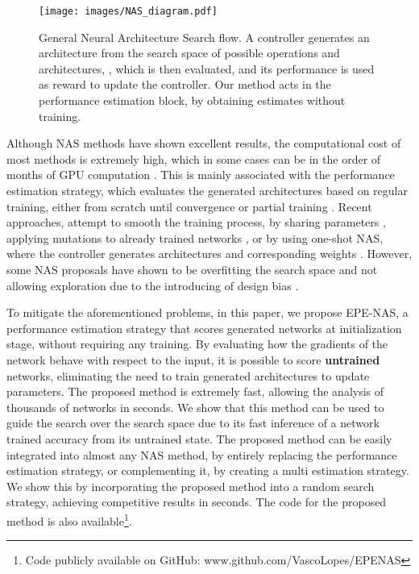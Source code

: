 \documentclass[10pt, conference]{IEEEtran}
\begin{document}
\begin{figure}[!t]
    \centering
    \texttt{[image: images/NAS\_diagram.pdf]}
    \caption{General Neural Architecture Search flow. A controller generates an architecture  from the search space of possible operations and architectures, , which is then evaluated, and its performance is used as reward to update the controller. Our method acts in the performance estimation block, by obtaining estimates without training. \label{fig:nasdiagram}}
\end{figure}

Although NAS methods have shown excellent results, the computational cost of most methods is extremely high, which in some cases can be in the order of months of GPU computation \cite{DBLP:conf/iclr/ZophL17, liu2018progressive, Zoph_2018}. This is mainly associated with the performance estimation strategy, which evaluates the generated architectures based on regular training, either from scratch until convergence or partial training \cite{runge2018learning, real2019aging}. Recent approaches, attempt to smooth the training process, by sharing parameters \cite{pham2018efficient}, applying mutations to already trained networks \cite{DBLP:conf/iclr/ElskenMH19}, or by using one-shot NAS, where the controller generates architectures and corresponding weights \cite{DBLP:conf/iclr/LiuSY19, DBLP:conf/iclr/CaiZH19, DBLP:conf/iclr/ZelaESMBH20}. However, some NAS proposals have shown to be overfitting the search space and not allowing exploration due to the introducing of design bias \cite{Yang2020NAS}.


To mitigate the aforementioned problems, in this paper, we propose EPE-NAS, a performance estimation strategy that scores generated networks at initialization stage, without requiring any training. By evaluating how the gradients of the network behave with respect to the input, it is possible to score \textbf{untrained} networks, eliminating the need to train generated architectures to update parameters. The proposed method is extremely fast, allowing the analysis of thousands of networks in seconds. We show that this method can be used to guide the search over the search space due to its fast inference of a network trained accuracy from its untrained state. The proposed method can be easily integrated into almost any NAS method, by entirely replacing the performance estimation strategy, or complementing it, by creating a multi estimation strategy. We show this by incorporating the proposed method into a random search strategy, achieving competitive results in seconds. The code for the proposed method is also available\footnote{Code publicly available on GitHub: www.github.com/VascoLopes/EPENAS}.
\end{document}
